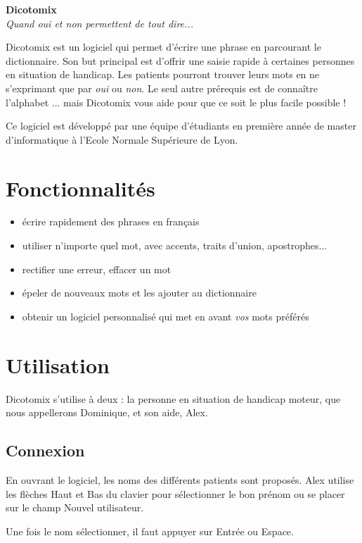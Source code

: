 \documentclass[french]{article}
\newcommand\image[2][.4]{\begin{center}\frame{\texttt{[image: images/\#2]}}\end{center}}
\begin{document}
	

\begin{center}
	\Huge\textbf{Dicotomix}\\
	\Large\textit{Quand oui et non permettent de tout dire...}
\end{center}
\vspace{1cm}

	Dicotomix est un logiciel qui permet d'écrire une phrase en parcourant le dictionnaire. Son but principal est d'offrir une saisie rapide à certaines personnes en situation de handicap. Les patients pourront trouver leurs mots en ne s'exprimant que par \emph{oui} ou \emph{non}. Le seul autre prérequis est de connaître l'alphabet ... mais Dicotomix vous aide pour que ce soit le plus facile possible !


	Ce logiciel est développé par une équipe d'étudiants en première année de master d'informatique à l'Ecole Normale Supérieure de Lyon.


\section{Fonctionnalités}
\begin{itemize}
	\item écrire rapidement des phrases en français
	\item utiliser n'importe quel mot, avec accents, traits d'union, apostrophes...
	\item rectifier une erreur, effacer un mot
	\item épeler de nouveaux mots et les ajouter au dictionnaire
	\item obtenir un logiciel personnalisé qui met en avant \emph{vos} mots préférés
\end{itemize}

\section{Utilisation}
Dicotomix s'utilise à deux : la personne en situation de handicap moteur, que nous appellerons Dominique, et son aide, Alex.
\subsection{Connexion}
En ouvrant le logiciel, les noms des différents patients sont proposés. Alex utilise les flèches Haut et Bas du clavier pour sélectionner le bon prénom ou se placer sur le champ \og Nouvel utilisateur\fg{}.
\image{login.png}
Une fois le nom sélectionner, il faut appuyer sur Entrée ou Espace.
\end{document}
